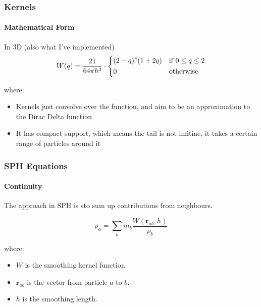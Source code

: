 \documentclass[notheorems, aspectratio=169]{beamer}
\begin{document}
  \begin{frame}
    \frametitle{Kernels}
    \framesubtitle{Mathematical Form}

    In 3D (also what I've implemented)
    \begin{equation}
      W(q) = \frac{21}{64\pi h^3} \cdot
      \begin{dcases}
        (2 - q)^4 (1 + 2q) & \text{if } 0 \leq q \leq 2 \\
        0 & \text{otherwise}
      \end{dcases}
      \end{equation}
    
    where:
    \begin{itemize}
      \item Kernels just convolve over the function, and aim to be an approximation to the Dirac Delta function
      \item It has compact support, which means the tail is not infitine, it takes a certain range of particles around it
    \end{itemize}
    
    \end{frame}
    



  \begin{frame}[fragile]
  \frametitle{SPH Equations}
  \framesubtitle{Continuity}
  
  The approach in SPH is sto sum up contributions from neighbours.
  
  \[
  \rho_a = \sum_{b} m_b \frac{W(\mathbf{r}_{ab}, h)}{\rho_b}
  \]
  
  
  where:
  \begin{itemize}
    \item \( W \) is the smoothing kernel function.
    \item \( \mathbf{r}_{ab} \) is the vector from particle \( a \) to \( b \).
    \item \( h \) is the smoothing length.
  \end{itemize}
  
  \end{frame}
\end{document}
